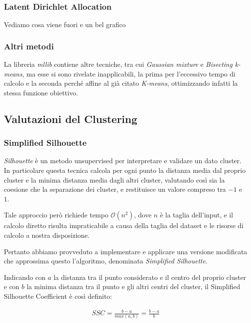 \documentclass[
	11pt, %
	a4paper, %
	oneside, %
	headinclude,footinclude, %
	BCOR5mm, %
]{scrartcl}
\begin{document}
		\subsubsection{Latent Dirichlet Allocation}

			Vediamo cosa viene fuori e un bel grafico

		\subsubsection{Altri metodi}
			La libreria \emph{mllib} contiene altre tecniche, tra cui \emph{Gaussian mixture} e \emph{Bisecting k-means}, ma esse si sono rivelate inapplicabili, la prima per l'eccessivo tempo di calcolo e la seconda perché affine al già citato \emph{K-means}, ottimizzando infatti la stessa funzione obiettivo.

	\subsection{Valutazioni del Clustering}

		\subsubsection{Simplified Silhouette}
			\emph{Silhouette} è un metodo unsupervised per interpretare e validare un dato cluster.
			In particolare questa tecnica calcola per ogni punto la distanza media dal proprio cluster e la minima distanza media dagli altri cluster, valutando così sia la coesione che la separazione dei cluster, e restituisce un valore compreso tra $-1$ e $1$.
			
			Tale approccio però richiede tempo $\mathcal{O}(n^2)$, dove $n$ è la taglia dell'input, e il calcolo diretto risulta impraticabile a causa della taglia del dataset e le risorse di calcolo a nostra disposizione.

			Pertanto abbiamo provveduto a implementare e applicare una versione modificata che approssima questo l'algoritmo, denominata \emph{Simplified Silhouette}\cite{sscmapreduce}.
			
			Indicando con $a$ la distanza tra il punto considerato e il centro del proprio cluster e con $b$ la minima distanza tra il punto e gli altri centri del cluster, il {Simplified Silhouette Coefficient} è così definito:

			\begin{equation} \begin{aligned} \label{eq:simplifiedSilhouette}
				SSC = \frac{b - a}{ max(a, b) } = \frac{b - a}{b}
			\end{aligned} \end{equation}
\end{document}
